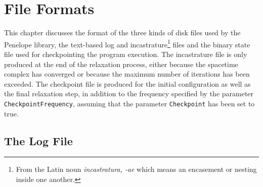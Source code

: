 \documentclass[12pt,letterpaper]{report}
\begin{document}
\chapter{File Formats}

This chapter discusses the format of the three kinds of disk files used by the Penelope library, the 
text-based log and incastrature\footnote{From the Latin noun \emph{incastratura, -ae} which means an 
encasement or nesting inside one another.} files and the binary state file used for checkpointing the 
program execution. The incastrature file is only produced at the end of the relaxation process, either 
because the spacetime complex has converged or because the maximum number of iterations has been exceeded. 
The checkpoint file is produced for the initial configuration as well as the final relaxation step, in 
addition to the frequency specified by the parameter \texttt{CheckpointFrequency}, assuming that the 
parameter \texttt{Checkpoint} has been set to true. 

\section{The Log File}
\end{document}
